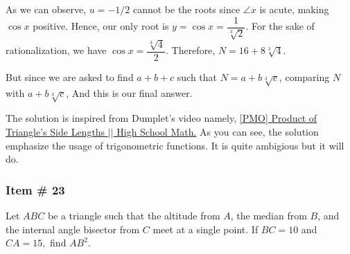 \documentclass[11pt,paper=letter]{scrartcl}
\begin{document}
    As we can observe, $u = -1/2$ cannot be the roots since $\angle x$ is acute, making $\cos x$ positive. Hence, our only root is $y = \cos x = \dfrac{1}{\sqrt[3]{{2}}}$. For the sake of rationalization, we have $\cos x = \dfrac{\sqrt[3]{4}}{2} $. Therefore, $N = 16 + 8\sqrt[3]{4}$.
    
    But since we are asked to find $a+b+c$ such that $N = a + b\sqrt[3]{c}$, comparing $N$ with $a + b\sqrt[3]{c}$,  And this is our final answer.
    
    \newpage
    
    \begin{mdframed}
    \begin{rem}
The solution is inspired from Dumplet's video namely, \href{https://www.youtube.com/watch?v=ia3DK69nhrY}{[PMO] Product of Triangle's Side Lengths $| |$ High School Math.} As you can see, the solution emphasize the usage of trigonometric functions. It is quite ambigious but it will do. 
    \end{rem}
    \end{mdframed}

 




\subsubsection{Item \# 23}

\begin{probboxed}
Let $ABC$ be a triangle such that the altitude from $A$, the median from $B$, and the internal angle bisector from $C$ meet at a single point. If $BC = 10$ and $CA = 15,$ find $AB^2.$
\end{probboxed}


\end{document}
